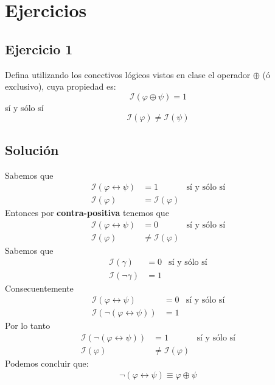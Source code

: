 \documentclass[a4paper]{article}
\begin{document}
\section{Ejercicios}
\subsection{Ejercicio 1}
Defina utilizando los conectivos lógicos vistos en clase el operador
$\oplus$ (ó exclusivo), cuya propiedad es:
\[
    \mathcal{I}\left(\varphi \oplus \psi\right) = 1
\]
sí y sólo sí
\[
    \mathcal{I}\left(\varphi\right) \neq \mathcal{I}\left(\psi\right)
\]
\subsection{Solución}
Sabemos que 
\begin{align*}
    \mathcal{I}\left(\varphi \leftrightarrow \psi\right) &= 1 &\text{sí y sólo sí} \\
    \mathcal{I}\left(\varphi\right) &= \mathcal{I}\left(\varphi\right)
\end{align*}
Entonces por \textbf{contra-positiva} tenemos que
\begin{align*}
    \mathcal{I}\left(\varphi \leftrightarrow \psi\right) &= 0 &\text{sí y sólo sí} \\
    \mathcal{I}\left(\varphi\right) &\neq \mathcal{I}\left(\varphi\right)
\end{align*}
Sabemos que 
\begin{align*}
    \mathcal{I}\left(\gamma\right) &= 0 &\text{sí y sólo sí} \\
    \mathcal{I}\left(\neg \gamma\right) &=1 &
\end{align*}
Consecuentemente
\begin{align*}
    \mathcal{I}\left(\varphi \leftrightarrow \psi\right) &= 0 &\text{sí y sólo sí} \\
    \mathcal{I}\left(\neg \left(\varphi \leftrightarrow \psi\right)\right) &= 1
\end{align*}
Por lo tanto
\begin{align*}
    \mathcal{I}\left(\neg \left(\varphi \leftrightarrow \psi\right)\right) &= 1 &\text{sí y sólo sí} \\
    \mathcal{I}\left(\varphi\right) &\neq \mathcal{I}\left(\varphi\right)    
\end{align*}
Podemos concluir que:
\begin{align*}
    \neg \left(\varphi \leftrightarrow \psi\right) \equiv \varphi \oplus \psi
\end{align*}
\end{document}
